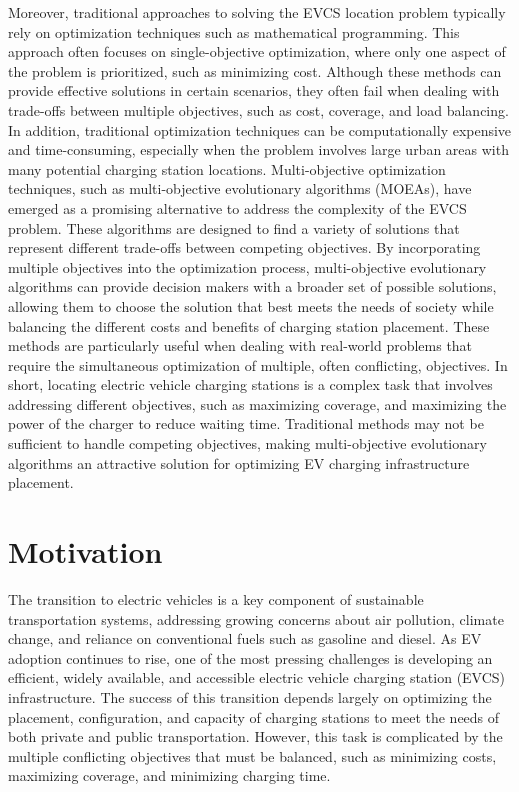 Moreover, traditional approaches to solving the EVCS location problem typically rely on optimization techniques such as mathematical programming. This approach often focuses on single-objective optimization, where only one aspect of the problem is prioritized, such as minimizing cost. Although these methods can provide effective solutions in certain scenarios, they often fail when dealing with trade-offs between multiple objectives, such as cost, coverage, and load balancing. In addition, traditional optimization techniques can be computationally expensive and time-consuming, especially when the problem involves large urban areas with many potential charging station locations. Multi-objective optimization techniques, such as multi-objective evolutionary algorithms (MOEAs), have emerged as a promising alternative to address the complexity of the EVCS problem. These algorithms are designed to find a variety of solutions that represent different trade-offs between competing objectives. By incorporating multiple objectives into the optimization process, multi-objective evolutionary algorithms can provide decision makers with a broader set of possible solutions, allowing them to choose the solution that best meets the needs of society while balancing the different costs and benefits of charging station placement. These methods are particularly useful when dealing with real-world problems that require the simultaneous optimization of multiple, often conflicting, objectives. In short, locating electric vehicle charging stations is a complex task that involves addressing different objectives, such as maximizing coverage,  and maximizing the power of the charger to reduce waiting time. Traditional methods may not be sufficient to handle competing objectives, making multi-objective evolutionary algorithms an attractive solution for optimizing EV charging infrastructure placement.

\section{Motivation}

The transition to electric vehicles is a key component of sustainable transportation systems, addressing growing concerns about air pollution, climate change, and reliance on conventional fuels such as gasoline and diesel. As EV adoption continues to rise, one of the most pressing challenges is developing an efficient, widely available, and accessible electric vehicle charging station (EVCS) infrastructure. The success of this transition depends largely on optimizing the placement, configuration, and capacity of charging stations to meet the needs of both private and public transportation. However, this task is complicated by the multiple conflicting objectives that must be balanced, such as minimizing costs, maximizing coverage, and minimizing charging time.

